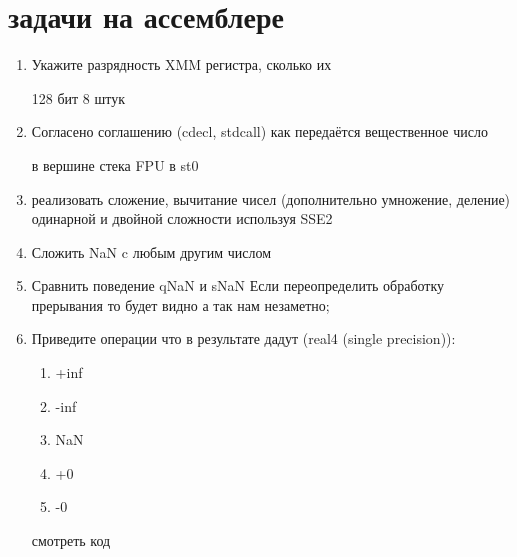 \documentclass[a4paper,10pt]{article}
\begin{document}
\newpage
\section*{задачи на ассемблере}
\begin{enumerate}
    \item Укажите разрядность XMM регистра, сколько их \par
    128 бит 8 штук
    \item Согласено соглашению (cdecl, stdcall) как передаётся вещественное число\par
    в вершине стека FPU в st0
    \item реализовать сложение, вычитание чисел (дополнительно умножение, деление) одинарной и двойной сложности используя SSE2
    \item Сложить NaN c любым другим числом
    \item Сравнить поведение qNaN и sNaN
    Если переопределить обработку прерывания то будет видно а так нам незаметно;
    \item Приведите операции что в результате дадут (real4 (single precision)):
    \begin{enumerate}
        \item +inf
        \item -inf
        \item NaN
        \item +0
        \item -0
    \end{enumerate}
    смотреть код
\end{enumerate}
\end{document}
